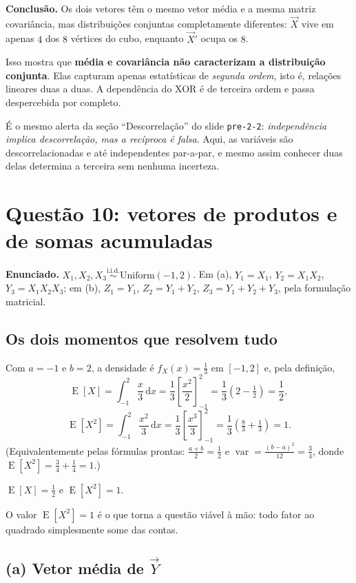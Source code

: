 \documentclass[11pt,a4paper]{article}
\newcommand{\dd}{\,\mathrm{d}}
\DeclareMathOperator{\E}{E}
\DeclareMathOperator{\var}{var}
\begin{document}
\textbf{Conclusão.} Os dois vetores têm o mesmo vetor média e a mesma matriz
covariância, mas distribuições conjuntas completamente diferentes: $\vec X$ vive
em apenas $4$ dos $8$ vértices do cubo, enquanto $\vec X'$ ocupa os $8$.

Isso mostra que \textbf{média e covariância não caracterizam a distribuição
conjunta}. Elas capturam apenas estatísticas de \emph{segunda ordem}, isto é,
relações lineares duas a duas. A dependência do XOR é de terceira ordem e passa
despercebida por completo.

É o mesmo alerta da seção ``Descorrelação'' do slide \texttt{pre-2-2}:
\emph{independência implica descorrelação, mas a recíproca é falsa}. Aqui, as
variáveis são descorrelacionadas e até independentes par-a-par, e mesmo assim
conhecer duas delas determina a terceira sem nenhuma incerteza.

\clearpage
\section{Questão 10: vetores de produtos e de somas acumuladas}

\textbf{Enunciado.} $X_1,X_2,X_3 \overset{\text{i.i.d.}}{\sim}\text{Uniform}(-1,2)$.
Em (a), $Y_1=X_1$, $Y_2=X_1X_2$, $Y_3=X_1X_2X_3$; em (b),
$Z_1=Y_1$, $Z_2=Y_1+Y_2$, $Z_3=Y_1+Y_2+Y_3$, pela formulação matricial.

\subsection*{Os dois momentos que resolvem tudo}

Com $a=-1$ e $b=2$, a densidade é $f_X(x)=\frac13$ em $[-1,2]$ e, pela definição,
\[
\E[X]=\int_{-1}^{2}\frac{x}{3}\dd x=\frac13\left[\frac{x^2}{2}\right]_{-1}^{2}
=\frac13\left(2-\tfrac12\right)=\frac12,
\]
\[
\E[X^2]=\int_{-1}^{2}\frac{x^2}{3}\dd x=\frac13\left[\frac{x^3}{3}\right]_{-1}^{2}
=\frac13\left(\tfrac83+\tfrac13\right)=1 .
\]
(Equivalentemente pelas fórmulas prontas: $\frac{a+b}{2}=\frac12$ e
$\var=\frac{(b-a)^2}{12}=\frac34$, donde $\E[X^2]=\frac34+\frac14=1$.)

\begin{resp}
$\E[X]=\tfrac12$ \quad e \quad $\E[X^2]=1$.
\end{resp}

O valor $\E[X^2]=1$ é o que torna a questão viável à mão: todo fator ao quadrado
simplesmente some das contas.

\subsection*{(a) Vetor média de $\vec Y$}
\end{document}
